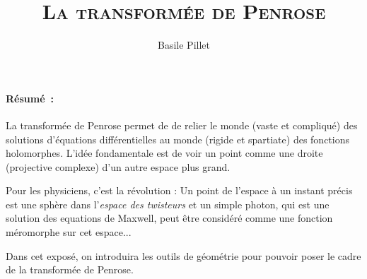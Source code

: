 \documentclass[10pt,a4paper]{article}
\author{Basile Pillet}
\title{\scshape La transformée de Penrose}
\date{}
\begin{document}
\maketitle

\paragraph{Résumé~:}
La transformée de Penrose permet de de relier le monde (vaste et compliqué) des solutions d'équations différentielles au monde (rigide et spartiate) des fonctions holomorphes. L'idée fondamentale est de voir un point comme une droite (projective complexe) d'un autre espace plus grand.

Pour les physiciens, c'est la révolution : Un point de l'espace à un instant précis est une sphère dans l'\textit{espace des twisteurs} et un simple photon, qui est une solution des equations de Maxwell, peut être considéré comme une fonction méromorphe sur cet espace...

Dans cet exposé, on introduira les outils de géométrie pour pouvoir poser le cadre de la transformée de Penrose.

\nocite{Ward-Wells, TwistorThED}


\end{document}
